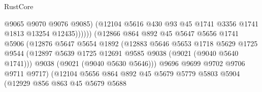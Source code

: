 \begin{lexlean}{RustCore}
\begin{coremodule}
                                        @9065
                                        @9070
                                        @9076
                                        @9085)
                                      (@12104
                                        @5616
                                        @430
                                        @93
                                        @45
                                        @1741
                                        @3356
                                        @1741
                                        @1813
                                        @13254
                                        @12435))))))
                            (@12866
                              @864
                              @892
                              @45
                              @5647
                              @5656
                              @1741
                              @5906
                              (@12876
                                @5647
                                @5654
                                @1892
                                (@12883
                                  @5646
                                  @5653
                                  @1718
                                  @5629
                                  @1725
                                  @9544
                                  (@12897
                                    @5639
                                    @1725
                                    @12691
                                    @9585
                                    @9038
                                    (@9021 (@9040 @5640 @1741)))
                                  @9038
                                  (@9021 (@9040 @5630 @5646)))
                                @9696
                                @9699
                                @9702
                                @9706
                                @9711
                                @9717)
                              (@12104
                                @5656
                                @864
                                @892
                                @45
                                @5679
                                @5779
                                @5803
                                @5904
                                (@12929
                                  @856
                                  @863
                                  @45
                                  @5679
                                  @5688

\end{coremodule}
\end{lexlean}
